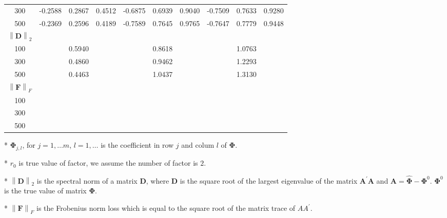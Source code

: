 \documentclass[12pt,a4paper,hyperref]{article}
\begin{document}
\begin{table}[H]
\begin{threeparttable}
\begin{tabular} {*{10}{c}}
300& -0.2588 & 0.2867 &0.4512&	-0.6875 &0.6939	&0.9040	& -0.7509& 0.7633&  0.9280\\
500&-0.2369 &  0.2596& 0.4189  &	-0.7589  &0.7645&0.9765 & -0.7647& 0.7779&	0.9448  \\
\cmidrule(lr){1-10}
$\left\| \boldsymbol{D} \right\|_{2} $\\
\cmidrule(lr){1-4}   \cmidrule(lr){5-7}   \cmidrule(lr){8-10}
100&  & 0.5940& &	  &	0.8618& & & 1.0763&   \\
300&   &0.4860 & &	  &0.9462	&	& & 1.2293&  \\
500& & 0.4463&   &	  &1.0437	& & &1.3130 &	  \\
\cmidrule(lr){1-10}
$\left\| \boldsymbol{F} \right\|_{F} $\\
\cmidrule(lr){1-4}   \cmidrule(lr){5-7}   \cmidrule(lr){8-10}
100&  & & &	  &	& & & &   \\
300&   &  & &	  &	&	& & &  \\
500& &  &   &	  &	& & & &	  \\
\bottomrule
\end{tabular}
\begin{tablenotes}
\footnotesize
  \item[*] $\boldsymbol{\Phi}_{j,l}$, for $j=1,\ldots m$, $l=1,\ldots$ is the coefficient in row $j$ and colum $l$ of $\boldsymbol{\Phi}$.
\item[*] $r_{0}$ is true value of factor, we assume the number of factor is $2$.
 \item[*] $\left\| \boldsymbol{D} \right\|_{2}$ is the spectral norm of a matrix $\boldsymbol{D}$, where $\boldsymbol{D}$ is the square root of the largest eigenvalue of the matrix $\boldsymbol{A}^{'}\boldsymbol{A}$ and $\boldsymbol{A}=\hat{\boldsymbol{\Phi}}- \boldsymbol{\Phi}^{0}$. $\boldsymbol{\Phi}^{0}$ is the true value of matrix $\boldsymbol{\Phi}$.
 \item[*] $\left\| \boldsymbol{F} \right\|_{F} $ is the Frobenius norm loss which is equal to the square root of the matrix trace of $AA^{'}$.
    \end{tablenotes}
\end{threeparttable}
\end{table}













\newpage

\renewcommand\refname{References}


\end{document}
